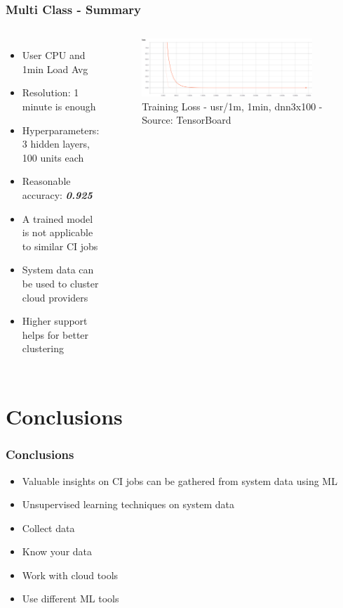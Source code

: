 \documentclass[aspectratio=169,11pt,hyperref={colorlinks=true}]{beamer}
\begin{document}
\begin{frame}
    \frametitle{Multi Class - Summary}
    \begin{columns}
        \begin{itemize}
            \item{User CPU and 1min Load Avg}
            \item{Resolution: 1 minute is enough}
            \item{Hyperparameters: 3 hidden layers, 100 units each}
            \item{Reasonable accuracy: \emph{\textbf{0.925}}}
            \item{A trained model is not applicable to similar CI jobs}
            \item{System data can be used to cluster cloud providers}
            \item{Higher support helps for better clustering}
        \end{itemize}
        \begin{figure}
          \begin{center}
            \includegraphics[width=0.9\textwidth,height=0.5\textheight]{graphs/cpu_1m-1min-dnn3x100-node_provider-loss_curve.png}
              \caption{Training Loss - usr/1m, 1min, dnn3x100 - Source: TensorBoard}
          \end{center}
        \end{figure}
      \end{columns}
\end{frame}

\section{Conclusions}
\begin{frame}
  \frametitle{Conclusions}
  \begin{itemize}
      \item{Valuable insights on CI jobs can be gathered from system data using ML}
      \item{Unsupervised learning techniques on system data}
      \item{Collect data}
      \item{Know your data}
      \item{Work with cloud tools}
      \item{Use different ML tools}
    \end{itemize}
\end{frame}
\end{document}
